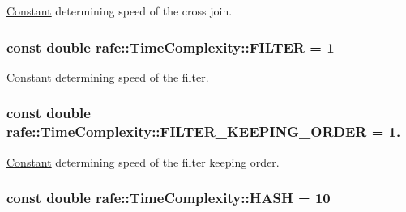 \hyperlink{classrafe_1_1_constant}{Constant} determining speed of the cross join. \hypertarget{classrafe_1_1_time_complexity_aa0625dabba1b84acbfd3bccb292e4ff6}{
\subsubsection[{F\+I\+L\+T\+E\+R}]{\setlength{\rightskip}{0pt plus 5cm}const double rafe\+::\+Time\+Complexity\+::\+F\+I\+L\+T\+E\+R = 1\hspace{0.3cm}{\ttfamily [static]}}}\label{classrafe_1_1_time_complexity_aa0625dabba1b84acbfd3bccb292e4ff6}
\hyperlink{classrafe_1_1_constant}{Constant} determining speed of the filter. \hypertarget{classrafe_1_1_time_complexity_a0e8e454747c5a1bacc5f0d0753c54819}{
\subsubsection[{F\+I\+L\+T\+E\+R\+\_\+\+K\+E\+E\+P\+I\+N\+G\+\_\+\+O\+R\+D\+E\+R}]{\setlength{\rightskip}{0pt plus 5cm}const double rafe\+::\+Time\+Complexity\+::\+F\+I\+L\+T\+E\+R\+\_\+\+K\+E\+E\+P\+I\+N\+G\+\_\+\+O\+R\+D\+E\+R = 1.\hspace{0.3cm}{\ttfamily [static]}}}\label{classrafe_1_1_time_complexity_a0e8e454747c5a1bacc5f0d0753c54819}
\hyperlink{classrafe_1_1_constant}{Constant} determining speed of the filter keeping order. \hypertarget{classrafe_1_1_time_complexity_acc03b3c0cae3944fbb8d93db0c668eea}{
\subsubsection[{H\+A\+S\+H}]{\setlength{\rightskip}{0pt plus 5cm}const double rafe\+::\+Time\+Complexity\+::\+H\+A\+S\+H = 10\hspace{0.3cm}{\ttfamily [static]}}}\label{classrafe_1_1_time_complexity_acc03b3c0cae3944fbb8d93db0c668eea}
